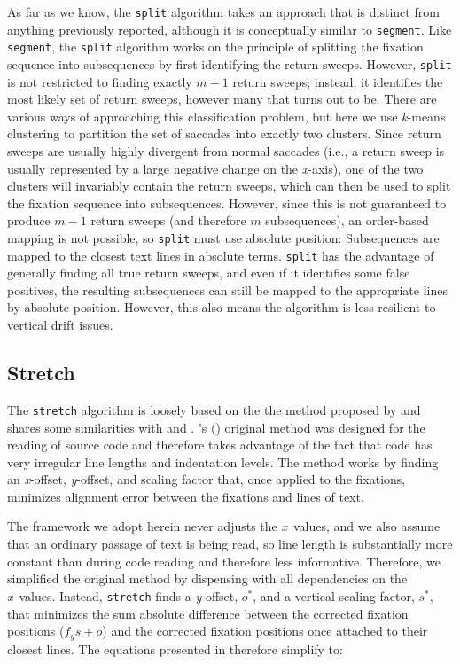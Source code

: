 \documentclass[doc,biblatex]{apa7}
\newcommand\possessivecite[1]{\citeauthor{#1}'s (\citeyear{#1})} %
\begin{document}
As far as we know, the \texttt{split} algorithm takes an approach that is distinct from anything previously reported, although it is conceptually similar to \texttt{segment}. Like \texttt{segment}, the \texttt{split} algorithm works on the principle of splitting the fixation sequence into subsequences by first identifying the return sweeps. However, \texttt{split} is not restricted to finding exactly $m-1$ return sweeps; instead, it identifies the most likely set of return sweeps, however many that turns out to be. There are various ways of approaching this classification problem, but here we use \textit{k}-means clustering to partition the set of saccades into exactly two clusters. Since return sweeps are usually highly divergent from normal saccades (i.e., a return sweep is usually represented by a large negative change on the \textit{x}-axis), one of the two clusters will invariably contain the return sweeps, which can then be used to split the fixation sequence into subsequences. However, since this is not guaranteed to produce $m-1$ return sweeps (and therefore $m$ subsequences), an order-based mapping is not possible, so \texttt{split} must use absolute position: Subsequences are mapped to the closest text lines in absolute terms. \texttt{split} has the advantage of generally finding all true return sweeps, and even if it identifies some false positives, the resulting subsequences can still be mapped to the appropriate lines by absolute position. However, this also means the algorithm is less resilient to vertical drift issues.

\subsection{Stretch}

The \texttt{stretch} algorithm is loosely based on the the method proposed by \textcite{Lohmeier:2015} and shares some similarities with \textcite{MartinezGomez:2012} and \textcite{Nussli:2011}. \possessivecite{Lohmeier:2015} original method was designed for the reading of source code and therefore takes advantage of the fact that code has very irregular line lengths and indentation levels. The method works by finding an \textit{x}-offset, \textit{y}-offset, and scaling factor that, once applied to the fixations, minimizes alignment error between the fixations and lines of text.

The framework we adopt herein never adjusts the \textit{x}~values, and we also assume that an ordinary passage of text is being read, so line length is substantially more constant than during code reading and therefore less informative. Therefore, we simplified the original method by dispensing with all dependencies on the \textit{x}~values. Instead, \texttt{stretch} finds a \textit{y}-offset, $o^\ast$, and a vertical scaling factor, $s^\ast$, that minimizes the sum absolute difference between the corrected fixation positions ($f_y s + o$) and the corrected fixation positions once attached to their closest lines. The equations presented in \textcite[pp.~37--38]{Lohmeier:2015} therefore simplify to:
\end{document}
